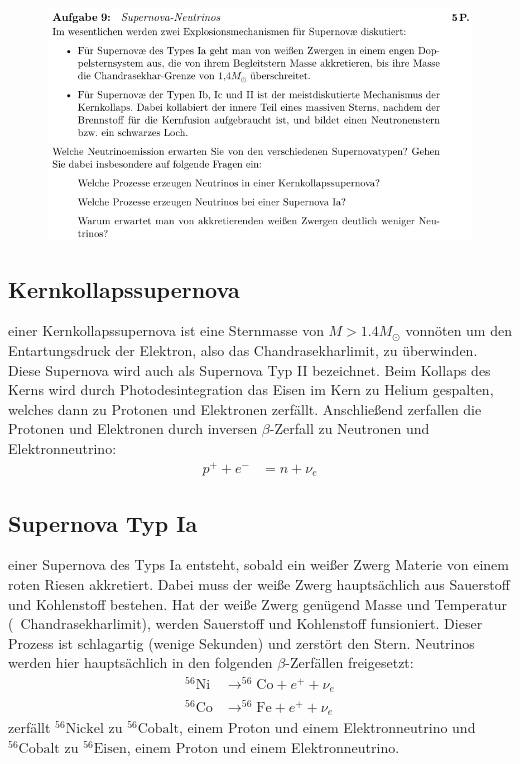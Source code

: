 \begin{figure}[H]
    \centering
    \includegraphics[width=\textwidth]{images/Aufgabe9.jpg}
    \label{fig:6}
\end{figure}

    \subsection{Kernkollapssupernova}

    \justifying einer Kernkollapssupernova ist eine Sternmasse von $M>1.4M_{\odot}$ vonnöten um den Entartungsdruck der Elektron,
    also das Chandrasekharlimit, zu überwinden. Diese Supernova wird auch als Supernova Typ II bezeichnet. Beim Kollaps des Kerns wird durch
    Photodesintegration das Eisen im Kern zu Helium gespalten, welches dann zu Protonen und Elektronen zerfällt. Anschließend zerfallen
    die Protonen und Elektronen durch inversen $\beta$-Zerfall zu Neutronen und Elektronneutrino:
    \begin{align*}
        p^+ + e^- &= n + \nu_e
    \end{align*}

    \subsection{Supernova Typ Ia}

    \justifying einer Supernova des Typs Ia entsteht, sobald ein weißer Zwerg Materie von einem roten Riesen akkretiert. 
    Dabei muss der weiße Zwerg hauptsächlich aus Sauerstoff und Kohlenstoff bestehen. Hat der weiße Zwerg genügend Masse und Temperatur
    (~Chandrasekharlimit), werden Sauerstoff und Kohlenstoff funsioniert. Dieser Prozess ist schlagartig (wenige Sekunden) und zerstört den
    Stern. Neutrinos werden hier hauptsächlich in den folgenden $\beta$-Zerfällen freigesetzt:
    \begin{align*}
        ^{56}\text{Ni} &\to ^{56}\text{Co} + e^+ + \nu_e\\
        ^{56}\text{Co} &\to ^{56}\text{Fe} + e^+ + \nu_e
    \end{align*}
    \justifying zerfällt $^{56}\text{Nickel}$ zu $^{56}\text{Cobalt}$, einem Proton und einem Elektronneutrino und $^{56}\text{Cobalt}$ zu $^{56}\text{Eisen}$, 
    einem Proton und einem Elektronneutrino.

